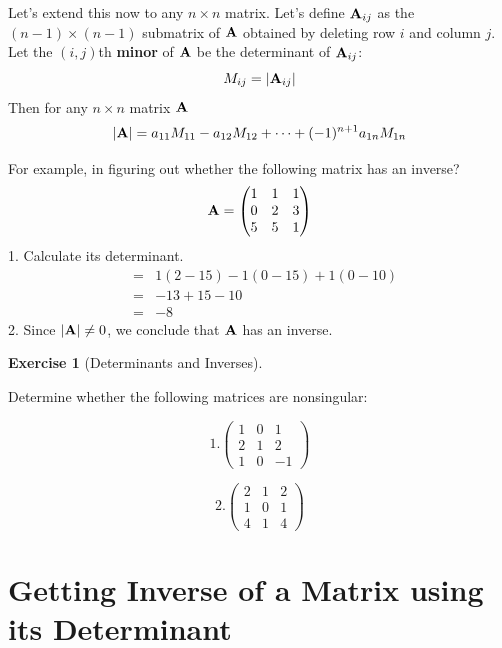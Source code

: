 \documentclass[
]{book}
\theoremstyle{definition}
\theoremstyle{definition}
\theoremstyle{definition}
\newtheorem{exercise}{Exercise}[chapter]
\theoremstyle{remark}
\begin{document}
Let's extend this now to any \(n\times n\) matrix. Let's define \({\bf A}_{ij}\) as the \((n-1)\times (n-1)\) submatrix of \({\bf A}\) obtained by deleting row \(i\) and column \(j\). Let the \((i,j)\)th \textbf{minor} of \({\bf A}\) be the determinant of \({\bf A}_{ij}\):
\[M_{ij}=|{\bf A}_{ij}|\]
Then for any \(n\times n\) matrix \({\bf A}\)
\[|{\bf A}|= a_{11}M_{11} - a_{12}M_{12} + \cdots + (-1)^{n+1} a_{1n} M_{1n}\]

For example, in figuring out whether the following matrix has an inverse?
\[{\bf A}=\begin{pmatrix} 1&1&1\\0&2&3\\5&5&1 \end{pmatrix}\]
1. Calculate its determinant.
\begin{eqnarray}
                &=& 1(2-15) - 1(0-15) + 1(0-10) \nonumber\\
                &=& -13+15-10 \nonumber\\
                &=& -8\nonumber
\end{eqnarray}
2. Since \(|{\bf A}|\ne 0\), we conclude that \({\bf A}\) has an inverse.

\begin{exercise}[Determinants and Inverses]
\protect\hypertarget{exr:determinants}{}{\label{exr:determinants} {} }

Determine whether the following matrices are nonsingular:

\[1. \begin{pmatrix}
            1 & 0 & 1\\
            2 & 1 & 2\\
            1 & 0 & -1
        \end{pmatrix}\]

\[2. \begin{pmatrix}
            2 & 1 & 2\\
            1 & 0 & 1\\
            4 & 1 & 4
        \end{pmatrix}\]
\end{exercise}

\hypertarget{getting-inverse-of-a-matrix-using-its-determinant}{%
\section{Getting Inverse of a Matrix using its Determinant}\label{getting-inverse-of-a-matrix-using-its-determinant}}
\end{document}
